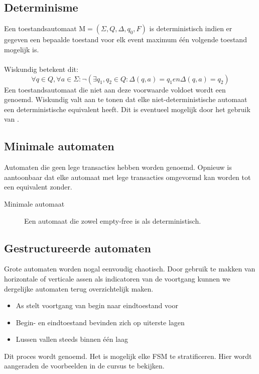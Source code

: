 \documentclass[../../main.tex]{subfiles}
\begin{document}
\subsection{Determinisme}
Een toestandsautomaat $\text{M} =  (\Sigma,Q,\Delta,q_0,F)$ is deterministisch indien er gegeven een bepaalde toestand voor elk event maximum \'e\'en volgende toestand mogelijk is.\\
\\
Wiskundig betekent dit:
\begin{equation*}
	\forall q \in Q, \forall a \in \Sigma : \neg ( \exists q_1, q_2 \in Q: \Delta (q,a) = q_1 en \Delta (q,a) = q_2 )
\end{equation*}
Een toestandsautomaat die niet aan deze voorwaarde voldoet wordt een  genoemd. Wiskundig valt aan te tonen dat elke niet-deterministische automaat een deterministische equivalent heeft. Dit is eventueel mogelijk door het gebruik van .
\subsection{Minimale automaten}
Automaten die geen lege transacties hebben worden  genoemd. Opnieuw is aantoonbaar dat elke automaat met lege transacties omgevormd kan worden tot een equivalent zonder.

\begin{description}
	\item[Minimale automaat] Een automaat die zowel empty-free is als deterministisch.
\end{description}

\subsection{Gestructureerde automaten}
Grote automaten worden nogal eenvoudig chaotisch. Door gebruik te makken van horizontale of verticale assen als indicatoren van de voortgang kunnen we dergelijke automaten terug overzichtelijk maken.
\begin{itemize}
	\item As stelt voortgang van begin naar eindtoestand voor
	\item Begin- en eindtoestand bevinden zich op uiterste lagen
	\item Lussen vallen steeds binnen \'e\'en laag
\end{itemize}
Dit proces wordt  genoemd. Het is mogelijk elke FSM te stratificeren. Hier wordt aangeraden de voorbeelden in de cursus te bekijken.
\end{document}
